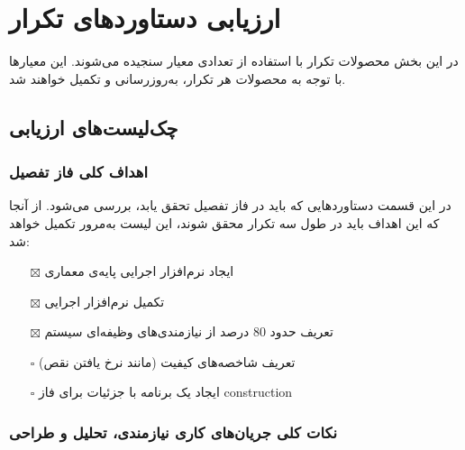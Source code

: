 \chapter{ارزیابی دستاوردهای تکرار}
در این بخش محصولات تکرار با استفاده از تعدادی معیار سنجیده می‌شوند. این معیارها با توجه به محصولات هر تکرار، به‌روزرسانی و تکمیل خواهند شد.
\section{چک‌لیست‌های ارزیابی}

\iffalse
Item icons for checklists:	
	\item[$\square$]
	\item[$\boxtimes$]
\fi

\subsection{    اهداف کلی فاز تفصیل}
در این قسمت دستاوردهایی که باید در فاز تفصیل تحقق یابد، بررسی می‌شود. از آنجا که این اهداف باید در طول سه تکرار محقق شوند، این لیست به‌مرور تکمیل خواهد شد:
\begin{itemize} \setlength\itemsep{0cm}
	\item[$\boxtimes$]
	ایجاد نرم‌افزار اجرایی پایه‌ی معماری
	\item[$\boxtimes$]
	تکمیل نرم‌افزار اجرایی
	\item[$\boxtimes$]
	تعریف حدود 80 درصد از نیازمندی‌های وظیفه‌ای سیستم
	\item[$\square$]
	تعریف شاخصه‌های کیفیت (مانند نرخ یافتن نقص)
	\item[$\square$]
	ایجاد یک برنامه با جزئیات برای فاز construction
	
\end{itemize}

\subsection{\hspace*{0.1cm}    نکات کلی جریان‌های کاری نیازمندی، تحلیل و طراحی}

